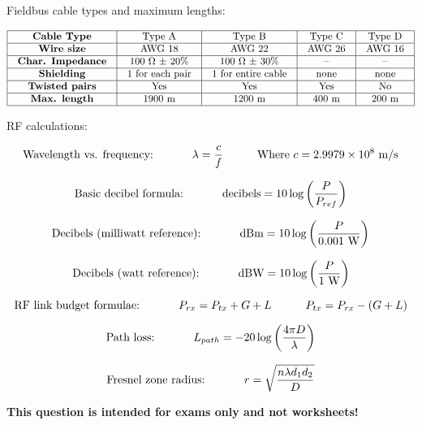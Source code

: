 

\noindent
Fieldbus cable types and maximum lengths:


$$\vbox{\offinterlineskip
\halign{\strut
\vrule \quad\hfil # \ \hfil & 
\vrule \quad\hfil # \ \hfil & 
\vrule \quad\hfil # \ \hfil & 
\vrule \quad\hfil # \ \hfil & 
\vrule \quad\hfil # \ \hfil \vrule \cr
\noalign{\hrule}
%
{\bf Cable Type} & Type A & Type B & Type C & Type D \cr
%
\noalign{\hrule}
%
{\bf Wire size} & AWG 18 & AWG 22 & AWG 26 & AWG 16 \cr
%
\noalign{\hrule}
%
{\bf Char. Impedance} & 100 $\Omega$ $\pm$ 20\% & 100 $\Omega$ $\pm$ 30\% & -- & -- \cr
%
\noalign{\hrule}
%
{\bf Shielding} & 1 for each pair & 1 for entire cable & none & none \cr
%
\noalign{\hrule}
%
{\bf Twisted pairs} & Yes & Yes & Yes & No \cr
%
\noalign{\hrule}
%
{\bf Max. length} & 1900 m & 1200 m & 400 m & 200 m \cr
%
\noalign{\hrule}
} %
}$$ %

\vskip 10pt

\noindent
RF calculations:

$$\hbox{Wavelength vs. frequency: \hskip 30pt} \lambda = {c \over f} \hbox{\hskip 30pt Where } c = 2.9979 \times 10^8 \hbox{ m/s}$$

\vskip 10pt

$$\hbox{Basic decibel formula: \hskip 30pt decibels} = 10 \log \left({P \over P_{ref}}\right)$$

\vskip 10pt

$$\hbox{Decibels (milliwatt reference): \hskip 30pt dBm} = 10 \log \left({P \over 0.001 \hbox{ W}}\right)$$

\vskip 10pt

$$\hbox{Decibels (watt reference): \hskip 30pt dBW} = 10 \log \left({P \over 1 \hbox{ W}}\right)$$

\vskip 10pt

$$\hbox{RF link budget formulae: \hskip 30pt} P_{rx} = P_{tx} + G + L \hskip 30pt P_{tx} = P_{rx} - (G + L) $$

\vskip 10pt

$$\hbox{Path loss: \hskip 30pt} L_{path} = -20 \log \left({4 \pi D \over \lambda}\right)$$

\vskip 10pt

$$\hbox{Fresnel zone radius: \hskip 30pt} r = \sqrt{{n \lambda d_1 d_2} \over D}$$














{\bf This question is intended for exams only and not worksheets!}


